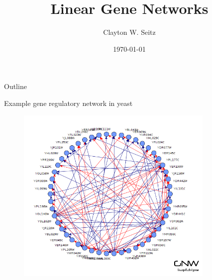 \documentclass[aspectratio=1610]{beamer}					%
\title{Linear Gene Networks}	%
\author{Clayton W. Seitz}								%
\date{\today}									%
\begin{document}
\begin{frame}
  \titlepage
\end{frame}

\begin{frame}{Outline}
  \tableofcontents
\end{frame}

%

\begin{frame}{Example gene regulatory network in yeast}

\begin{figure}
\includegraphics[width=9.5cm]{yeast-net.png}
\end{figure}

\end{frame}
\end{document}
